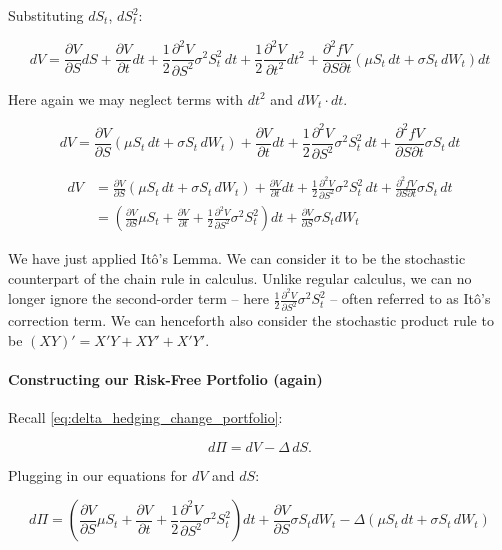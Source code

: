 \documentclass{article}
\begin{document}
Substituting $dS_t$, $dS_t^2$:

\[
    dV = \frac{\partial V}{\partial S} dS + \frac{\partial V}{\partial t} dt + \frac{1}{2} \frac{\partial^2 V}{\partial S^2} \sigma^2 S_t^2\, dt + \frac{1}{2} \frac{\partial^2 V}{\partial t^2} dt^2 + \frac{\partial^2 fV}{\partial S \partial t} (\mu S_t\, dt + \sigma S_t\, dW_t) dt
\]

Here again we may neglect terms with $dt^2$ and $dW_t \cdot dt$.

\[
    dV = \frac{\partial V}{\partial S} (\mu S_t\, dt + \sigma S_t\, dW_t) + \frac{\partial V}{\partial t} dt + \frac{1}{2} \frac{\partial^2 V}{\partial S^2} \sigma^2 S_t^2\, dt + \frac{\partial^2 fV}{\partial S \partial t} \sigma S_t\, dt
\]

\begin{align*}
    dV &= \frac{\partial V}{\partial S} (\mu S_t\, dt + \sigma S_t\, dW_t) + \frac{\partial V}{\partial t} dt + \frac{1}{2} \frac{\partial^2 V}{\partial S^2} \sigma^2 S_t^2\, dt + \frac{\partial^2 fV}{\partial S \partial t} \sigma S_t\, dt \\
    &= \left( \frac{\partial V}{\partial S} \mu S_t + \frac{\partial V}{\partial t} + \frac{1}{2} \frac{\partial^2 V}{\partial S^2} \sigma^2 S_t^2 \right) dt + \frac{\partial V}{\partial S} \sigma S_t dW_t
\end{align*}

We have just applied Itô's Lemma. We can consider it to be the stochastic counterpart of the chain rule in calculus. Unlike regular calculus, we can no longer ignore the second-order term -- here $\frac{1}{2} \frac{\partial^2 V}{\partial S^2} \sigma^2 S_t^2$ -- often referred to as Itô's correction term. We can henceforth also consider the stochastic product rule to be $(XY)' = X'Y + XY' + X'Y'$.

\paragraph{Constructing our Risk-Free Portfolio (again)}

Recall \ref{eq:delta_hedging_change_portfolio}:

\[
    d\Pi = dV - \Delta\,dS.
\]

Plugging in our equations for $dV$ and $dS$:

\[
    d\Pi = \left( \frac{\partial V}{\partial S} \mu S_t + \frac{\partial V}{\partial t} + \frac{1}{2} \frac{\partial^2 V}{\partial S^2} \sigma^2 S_t^2 \right) dt + \frac{\partial V}{\partial S} \sigma S_t dW_t - \Delta \left(\mu S_t\, dt + \sigma S_t\, dW_t\right)
\]
\end{document}
